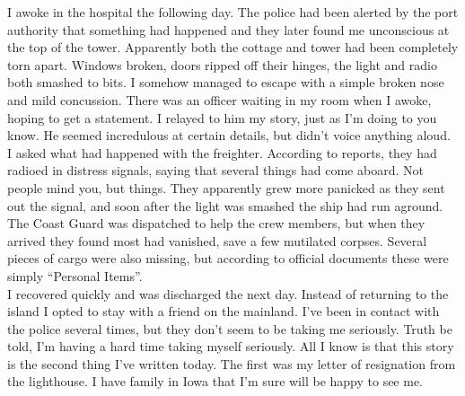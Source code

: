 \documentclass[a5paper]{scrartcl}
\begin{document}
I awoke in the hospital the following day. The police had been alerted by the port authority that something had happened and they later found me unconscious at the top of the tower. Apparently both the cottage and tower had been completely torn apart. Windows broken, doors ripped off their hinges, the light and radio both smashed to bits. I somehow managed to escape with a simple broken nose and mild concussion. There was an officer waiting in my room when I awoke, hoping to get a statement. I relayed to him my story, just as I'm doing to you know. He seemed incredulous at certain details, but didn't voice anything aloud.\\


I asked what had happened with the freighter. According to reports, they had radioed in distress signals, saying that several things had come aboard. Not people mind you, but things. They apparently grew more panicked as they sent out the signal, and soon after the light was smashed the ship had run aground. The Coast Guard was dispatched to help the crew members, but when they arrived they found most had vanished, save a few mutilated corpses. Several pieces of cargo were also missing, but according to official documents these were simply \enquote{Personal Items}.\\


I recovered quickly and was discharged the next day. Instead of returning to the island I opted to stay with a friend on the mainland. I've been in contact with the police several times, but they don't seem to be taking me seriously. Truth be told, I'm having a hard time taking myself seriously.  All I know is that this story is the second thing I've written today. The first was my letter of resignation from the lighthouse. I have family in Iowa that I'm sure will be happy to see me.\\
\end{document}
